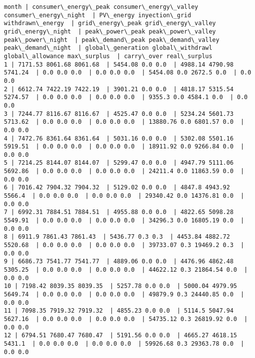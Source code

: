 \documentclass[11pt]{article}
\begin{document}
    \begin{Verbatim}[commandchars=\\\{\}]
month | consumer\_energy\_peak consumer\_energy\_valley consumer\_energy\_night  | PV\_energy inyection\_grid withdrawn\_energy  | grid\_energy\_peak grid\_energy\_valley grid\_energy\_night  | peak\_power\_peak peak\_power\_valley peak\_power\_night  | peak\_demand\_peak peak\_demand\_valley peak\_demand\_night  | global\_generation global\_withdrawl global\_allowance max\_surplus  | carry\_over real\_surplus
1 | 7171.53 8061.68 8061.68  | 5454.08 0.0 0.0  | 4988.14 4790.98 5741.24  | 0.0 0.0 0.0  | 0.0 0.0 0.0  | 5454.08 0.0 2672.5 0.0  | 0.0 0.0
2 | 6612.74 7422.19 7422.19  | 3901.21 0.0 0.0  | 4818.17 5315.54 5274.57  | 0.0 0.0 0.0  | 0.0 0.0 0.0  | 9355.3 0.0 4584.1 0.0  | 0.0 0.0
3 | 7244.77 8116.67 8116.67  | 4525.47 0.0 0.0  | 5234.24 5601.73 5713.62  | 0.0 0.0 0.0  | 0.0 0.0 0.0  | 13880.76 0.0 6801.57 0.0  | 0.0 0.0
4 | 7472.76 8361.64 8361.64  | 5031.16 0.0 0.0  | 5302.08 5501.16 5919.51  | 0.0 0.0 0.0  | 0.0 0.0 0.0  | 18911.92 0.0 9266.84 0.0  | 0.0 0.0
5 | 7214.25 8144.07 8144.07  | 5299.47 0.0 0.0  | 4947.79 5111.06 5692.86  | 0.0 0.0 0.0  | 0.0 0.0 0.0  | 24211.4 0.0 11863.59 0.0  | 0.0 0.0
6 | 7016.42 7904.32 7904.32  | 5129.02 0.0 0.0  | 4847.8 4943.92 5566.4  | 0.0 0.0 0.0  | 0.0 0.0 0.0  | 29340.42 0.0 14376.81 0.0  | 0.0 0.0
7 | 6992.31 7884.51 7884.51  | 4955.88 0.0 0.0  | 4822.65 5098.28 5549.91  | 0.0 0.0 0.0  | 0.0 0.0 0.0  | 34296.3 0.0 16805.19 0.0  | 0.0 0.0
8 | 6911.9 7861.43 7861.43  | 5436.77 0.3 0.3  | 4453.84 4882.72 5520.68  | 0.0 0.0 0.0  | 0.0 0.0 0.0  | 39733.07 0.3 19469.2 0.3  | 0.0 0.0
9 | 6686.73 7541.77 7541.77  | 4889.06 0.0 0.0  | 4476.96 4862.48 5305.25  | 0.0 0.0 0.0  | 0.0 0.0 0.0  | 44622.12 0.3 21864.54 0.0  | 0.0 0.0
10 | 7198.42 8039.35 8039.35  | 5257.78 0.0 0.0  | 5000.04 4979.95 5649.74  | 0.0 0.0 0.0  | 0.0 0.0 0.0  | 49879.9 0.3 24440.85 0.0  | 0.0 0.0
11 | 7098.35 7919.32 7919.32  | 4855.23 0.0 0.0  | 5114.5 5047.94 5627.16  | 0.0 0.0 0.0  | 0.0 0.0 0.0  | 54735.12 0.3 26819.92 0.0  | 0.0 0.0
12 | 6794.51 7680.47 7680.47  | 5191.56 0.0 0.0  | 4665.27 4618.15 5431.1  | 0.0 0.0 0.0  | 0.0 0.0 0.0  | 59926.68 0.3 29363.78 0.0  | 0.0 0.0

    \end{Verbatim}
\end{document}
